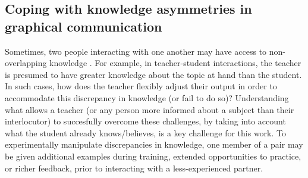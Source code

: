 \documentclass[12pt]{article}
\begin{document}
\subsection{Coping with knowledge asymmetries in graphical communication}

Sometimes, two people interacting with one another may have access to non-overlapping knowledge \cite{Wu:2007tz}. For example, in teacher-student interactions, the teacher is presumed to have greater knowledge about the topic at hand than the student. In such cases, how does the teacher flexibly adjust their output in order to accommodate this discrepancy in knowledge (or fail to do so)? Understanding what allows a teacher (or any person more informed about a subject than their interlocutor) to succesfully overcome these challenges, by taking into account what the student already knows/believes, is a key challenge for this work. To experimentally manipulate discrepancies in knowledge, one member of a pair may be given additional examples during training, extended opportunities to practice, or richer feedback, prior to interacting with a less-experienced partner. 


\setlength{\bibleftmargin}{.125in}
\setlength{\bibindent}{-\bibleftmargin}

\end{document}
